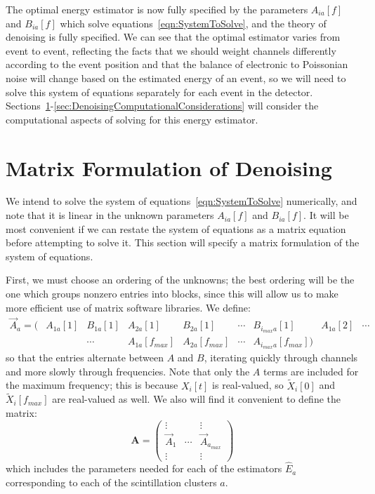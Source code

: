 The optimal energy estimator is now fully specified by the parameters $A_{ia}[f]$ and $B_{ia}[f]$ which solve equations~\ref{eqn:SystemToSolve}, and the theory of denoising is fully specified.  We can see that the optimal estimator varies from event to event, reflecting the facts that we should weight channels differently according to the event position and that the balance of electronic to Poissonian noise will change based on the estimated energy of an event, so we will need to solve this system of equations separately for each event in the detector.  Sections~\ref{sec:MatrixFormulationOfDenoising}-\ref{sec:DenoisingComputationalConsiderations} will consider the computational aspects of solving for this energy estimator.

\section{Matrix Formulation of Denoising}\label{sec:MatrixFormulationOfDenoising}

We intend to solve the system of equations~\ref{eqn:SystemToSolve} numerically, and note that it is linear in the unknown parameters $A_{ia}[f]$ and $B_{ia}[f]$.  It will be most convenient if we can restate the system of equations as a matrix equation before attempting to solve it.  This section will specify a matrix formulation of the system of equations.

First, we must choose an ordering of the unknowns; the best ordering will be the one which groups nonzero entries into blocks, since this will allow us to make more efficient use of matrix software libraries.  We define:
\begin{equation} \begin{matrix}
\vec{A}_a = \bigg( & A_{1 a}[1] & B_{1 a}[1] & A_{2 a}[1] & B_{2 a}[1] & \cdots & B_{i_{max} a}[1] & A_{1 a}[2] & \cdots \\
& & \cdots  & A_{1 a}[f_{max}] & A_{2 a}[f_{max}] & \cdots & A_{i_{max} a}[f_{max}] \bigg)
\end{matrix}\end{equation}
so that the entries alternate between $A$ and $B$, iterating quickly through channels and more slowly through frequencies.  Note that only the $A$ terms are included for the maximum frequency; this is because $X_i[t]$ is real-valued, so $\widetilde{X}_i[0]$ and $\widetilde{X}_i[f_{max}]$ are real-valued as well.  We also will find it convenient to define the matrix:
\begin{equation}
\mathbf{A} = \begin{pmatrix}
\vdots & & \vdots \\
\vec{A}_1 & \cdots & \vec{A}_{a_{max}} \\
\vdots & & \vdots
\end{pmatrix}
\end{equation}
which includes the parameters needed for each of the estimators $\widehat{E}_a$ corresponding to each of the scintillation clusters $a$.


